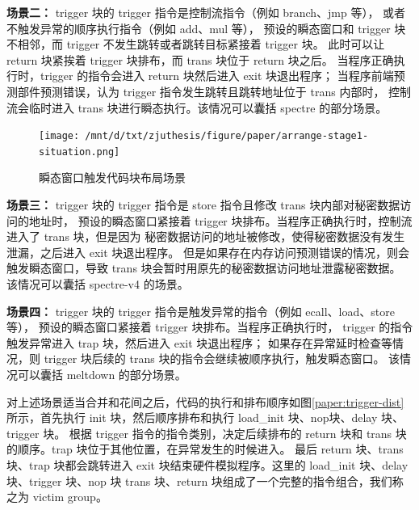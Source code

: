 \textbf{场景二：} trigger 块的 trigger 指令是控制流指令（例如 branch、jmp 等），
或者不触发异常的顺序执行指令（例如 add、mul 等），
预设的瞬态窗口和 trigger 块不相邻，而 trigger 不发生跳转或者跳转目标紧接着 trigger 块。
此时可以让 return 块紧挨着 trigger 块排布，而 trans 块位于 return 块之后。
当程序正确执行时，trigger 的指令会进入 return 块然后进入 exit 块退出程序；
当程序前端预测部件预测错误，认为 trigger 指令发生跳转且跳转地址位于 trans 内部时，
控制流会临时进入 trans 块进行瞬态执行。该情况可以囊括 spectre 的部分场景。\par

\begin{figure}[!h]
    \centering
    \texttt{[image: /mnt/d/txt/zjuthesis/figure/paper/arrange-stage1-situation.png]}
    \caption{瞬态窗口触发代码块布局场景}
    \label{paper:trigger-dist-situation}
\end{figure}

\textbf{场景三：} trigger 块的 trigger 指令是 store 指令且修改 trans 块内部对秘密数据访问的地址时，
预设的瞬态窗口紧接着 trigger 块排布。当程序正确执行时，控制流进入了 trans 块，但是因为
秘密数据访问的地址被修改，使得秘密数据没有发生泄漏，之后进入 exit 块退出程序。
但是如果存在内存访问预测错误的情况，则会触发瞬态窗口，导致 trans 块会暂时用原先的秘密数据访问地址泄露秘密数据。
该情况可以囊括 spectre-v4 的场景。\par

\textbf{场景四：} trigger 块的 trigger 指令是触发异常的指令（例如 ecall、load、store 等），
预设的瞬态窗口紧接着 trigger 块排布。当程序正确执行时，
trigger 的指令触发异常进入 trap 块，然后进入 exit 块退出程序；
如果存在异常延时检查等情况，则 trigger 块后续的 trans 块的指令会继续被顺序执行，触发瞬态窗口。
该情况可以囊括 meltdown 的部分场景。\par

对上述场景适当合并和花间之后，代码的执行和排布顺序如图\ref{paper:trigger-dist}所示，首先执行 init 块，然后顺序排布和执行 load\_init 块、nop块、delay 块、trigger 块。
根据 trigger 指令的指令类别，决定后续排布的 return 块和 trans 块的顺序。trap 块位于其他位置，在异常发生的时候进入。
最后 return 块、trans 块、trap 块都会跳转进入 exit 块结束硬件模拟程序。这里的 load\_init 块、delay 块、trigger 块、nop 块
trans 块、return 块组成了一个完整的指令组合，我们称之为 victim group。\par

